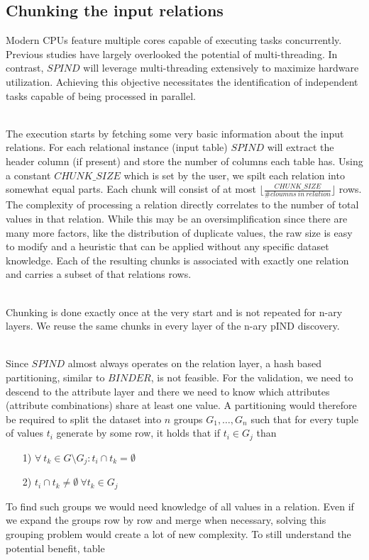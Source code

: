 \subsection{Chunking the input relations}
Modern CPUs feature multiple cores capable of executing tasks concurrently. Previous studies have largely overlooked the potential of multi-threading. In contrast, $SPIND$ will leverage multi-threading extensively to maximize hardware utilization. Achieving this objective necessitates the identification of independent tasks capable of being processed in parallel.

\noindent \\ The execution starts by fetching some very basic information about the input relations. For each relational instance (input table) $SPIND$ will extract the header column (if present) and store the number of columns each table has. Using a constant $CHUNK\_SIZE$ which is set by the user, we spilt each relation into somewhat equal parts. Each chunk will consist of at most $\lfloor \frac{CHUNK\_SIZE}{\# cloumns \: in \: relation} \rfloor$ rows. The complexity of processing a relation directly correlates to the number of total values in that relation. While this may be an oversimplification since there are many more factors, like the distribution of duplicate values, the raw size is easy to modify and a heuristic that can be applied without any specific dataset knowledge. Each of the resulting chunks is associated with exactly one relation and carries a subset of that relations rows.

\noindent \\ Chunking is done exactly once at the very start and is not repeated for n-ary layers. We reuse the same chunks in every layer of the n-ary pIND discovery.

\noindent \\ Since $SPIND$ almost always operates on the relation layer, a hash based partitioning, similar to $BINDER$, is not feasible. For the validation, we need to descend to the attribute layer and there we need to know which attributes (attribute combinations) share at least one value. A partitioning would therefore be required to split the dataset into $n$ groups $G_1, \dots, G_n$ such that for every tuple of values $t_i$ generate by some row, it holds that if $t_i \in G_j$ than 
\begin{itemize}
    \item[1)] $\forall \: t_k \in G \setminus G_j : t_i \cap t_k = \emptyset$
    \item[2)] $t_i \cap t_k \not = \emptyset \: \forall t_k \in G_j$
\end{itemize}
To find such groups we would need knowledge of all values in a relation. Even if we expand the groups row by row and merge when necessary, solving this grouping problem would create a lot of new complexity. To still understand the potential benefit, table 

